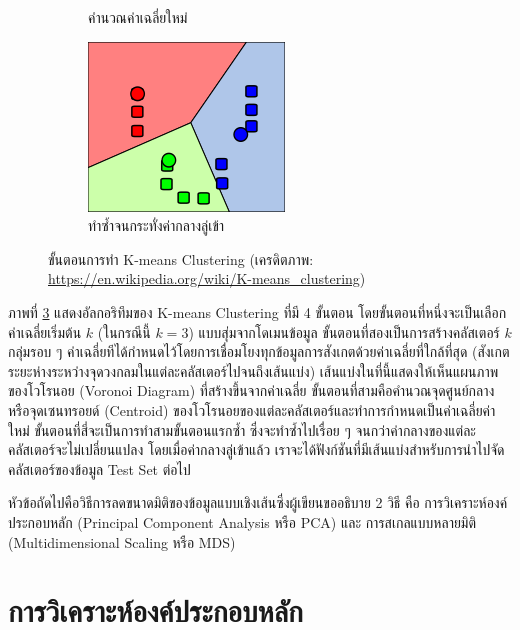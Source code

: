 \begin{figure}[H]
\begin{subfigure}{0.4\textwidth}
        \caption{คำนวณค่าเฉลี่ยใหม่}
        \label{fig:k_means_step3}
    \end{subfigure}%
    \begin{subfigure}{0.4\textwidth}
        \centering
        \includegraphics[width=0.5\linewidth]{fig/k-means-step4.png}
        \caption{ทำซ้ำจนกระทั่งค่ากลางลู่เข้า}
        \label{fig:k_means_step4}
    \end{subfigure}
    \caption{ขั้นตอนการทำ K-means Clustering (เครดิตภาพ: \url{https://en.wikipedia.org/wiki/K-means_clustering})}
    \label{fig:k_means}
\end{figure}

ภาพที่ \ref{fig:k_means} แสดงอัลกอริทึมของ K-means Clustering ที่มี 4 ขั้นตอน โดยขั้นตอนที่หนึ่งจะเป็นเลือกค่าเฉลี่ยเริ่มต้น $k$ (ในกรณีนี้ $k = 3$) แบบสุ่มจากโดเมนข้อมูล ขั้นตอนที่สองเป็นการสร้างคลัสเตอร์ $k$ กลุ่มรอบ ๆ ค่าเฉลี่ยทีได้กำหนดไว้โดยการเชื่อมโยงทุกข้อมูลการสังเกตด้วยค่าเฉลี่ยที่ใกล้ที่สุด (สังเกตระยะห่างระหว่างจุดวงกลมในแต่ละคลัสเตอร์ไปจนถึงเส้นแบ่ง) เส้นแบ่งในที่นี้แสดงให้เห็นแผนภาพของโวโรนอย (Voronoi Diagram) ที่สร้างขึ้นจากค่าเฉลี่ย ขั้นตอนที่สามคือคำนวณจุดศูนย์กลางหรือจุดเซนทรอยด์ (Centroid) ของโวโรนอยของแต่ละคลัสเตอร์และทำการกำหนดเป็นค่าเฉลี่ยค่าใหม่ ขั้นตอนที่สี่จะเป็นการทำสามขั้นตอนแรกซ้ำ ซึ่งจะทำซ้ำไปเรื่อย ๆ จนกว่าค่ากลางของแต่ละคลัสเตอร์จะไม่เปลี่ยนแปลง โดยเมื่อค่ากลางลู่เข้าแล้ว เราจะได้ฟังก์ชันที่มีเส้นแบ่งสำหรับการนำไปจัดคลัสเตอร์ของข้อมูล Test Set ต่อไป

หัวข้อถัดไปคือวิธีการลดขนาดมิติของข้อมูลแบบเชิงเส้นซึ่งผู้เขียนขออธิบาย 2 วิธี คือ การวิเคราะห์องค์ประกอบหลัก (Principal Component Analysis หรือ PCA) และ การสเกลแบบหลายมิติ (Multidimensional Scaling หรือ MDS)

\section{การวิเคราะห์องค์ประกอบหลัก}
\label{sec:pca}

